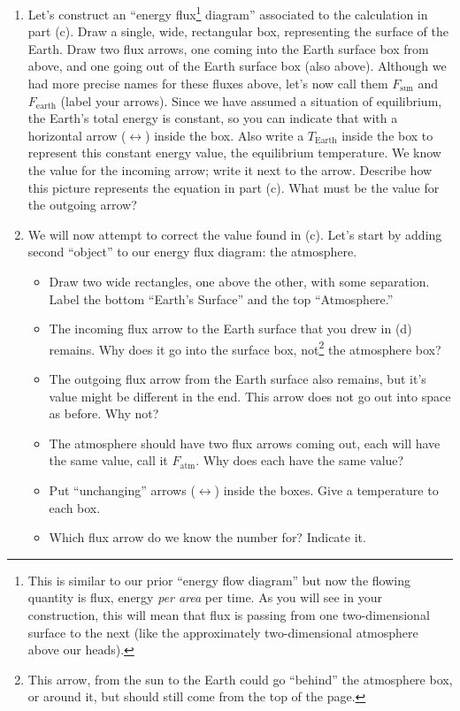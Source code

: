 \documentclass[12pt]{article}
\begin{document}
\begin{enumerate}
\begin{enumerate}
	\item Let's construct an ``energy flux\footnote{This is similar to our prior ``energy flow diagram'' but now the flowing quantity is flux, energy {\em per area} per time.  As you will see in your construction, this will mean that flux is passing from one two-dimensional surface to the next (like the approximately two-dimensional atmosphere above our heads).} diagram'' associated to the calculation in part (c).  Draw a single, wide, rectangular box, representing the surface of the Earth. Draw two flux arrows, one coming into the Earth surface box from above, and one going out of the Earth surface box (also above). Although we had more precise names for these fluxes above, let's now call them $F_\text{sun}$ and $F_\text{earth}$ (label your arrows). Since we have assumed a situation of equilibrium, the Earth's total energy is constant, so you can indicate that with a horizontal arrow ($\leftrightarrow$) inside the box. Also write a $T_\text{Earth}$ inside the box to represent this constant energy value, the equilibrium temperature. We know the value for the incoming arrow; write it next to the arrow. Describe how this picture represents the equation in part (c).  What must be the value for the outgoing arrow?
	\item We will now attempt to correct the value found in (c).  Let's start by adding second ``object'' to our energy flux diagram: the atmosphere. 
		\begin{itemize}
		\item Draw two wide rectangles, one above the other, with some separation. Label the bottom ``Earth's Surface'' and the top ``Atmosphere.''  
		\item The incoming flux arrow to the Earth surface that you drew in (d) remains.  Why does it go into the surface box, not\footnote{This arrow, from the sun to the Earth could go ``behind'' the atmosphere box, or around it, but should still come from the top of the page.} the atmosphere box?
		\item The outgoing flux arrow from the Earth surface also remains, but it's value might be different in the end.  This arrow does not go out into space as before. Why not?
		\item The atmosphere should have two flux arrows coming out, each will have the same value, call it $F_\text{atm}$. Why does each have the same value?
		\item Put ``unchanging'' arrows ($\leftrightarrow$) inside the boxes. Give a temperature to each box.  
		\item Which flux arrow do we know the number for? Indicate it.

\end{itemize}
\end{enumerate}
\end{enumerate}
\end{document}

